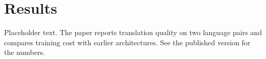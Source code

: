 \section{Results}

Placeholder text. The paper reports translation quality on two language pairs and compares training cost with earlier architectures. See the published version for the numbers.
